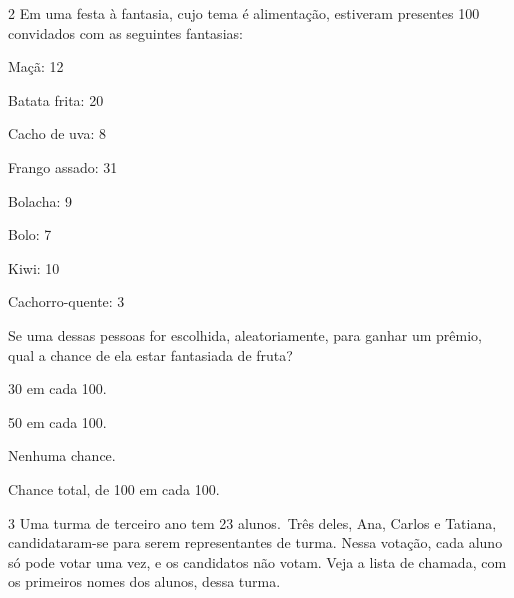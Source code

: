 \num{2} Em uma festa à fantasia, cujo tema é alimentação, estiveram presentes  100 convidados com as seguintes fantasias:

\begin{myquote}
\begin{itemize}
  \begin{multicols}{2}
\item [] Maçã: 12
\item [] Batata frita: 20
\item [] Cacho de uva: 8
\item [] Frango assado: 31
\item [] Bolacha: 9
\item [] Bolo: 7
\item [] Kiwi: 10
\item [] Cachorro-quente: 3
  \end{multicols}
\end{itemize}
\end{myquote}

Se uma dessas pessoas for escolhida, aleatoriamente, para ganhar um prêmio, qual a chance de ela estar fantasiada de fruta?

\begin{escolha}
\begin{multicols}{2}
\item
30 em cada 100.
\item
50 em cada 100.
\item
Nenhuma chance.
\item
Chance total, de 100 em cada 100.
\end{multicols}
\end{escolha}


\num{3} Uma turma de terceiro ano tem 23 alunos.~Três deles, Ana, Carlos e Tatiana, candidataram-se para serem representantes de turma. Nessa votação, cada aluno só pode votar uma vez, e os candidatos não votam. Veja a lista de chamada, com os primeiros nomes dos alunos, dessa turma.

